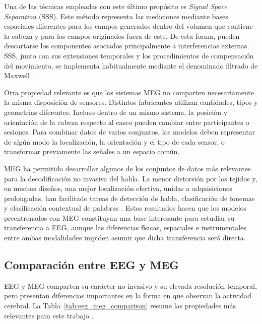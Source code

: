 

Una de las técnicas empleadas con este último propósito es \textit{Signal Space Separation} (SSS). Este método representa las mediciones mediante bases espaciales diferentes para los campos generados dentro del volumen que contiene la cabeza y para los campos originados fuera de este. De esta forma, pueden descartarse los componentes asociados principalmente a interferencias externas. SSS, junto con sus extensiones temporales y los procedimientos de compensación del movimiento, se implementa habitualmente mediante el denominado filtrado de Maxwell \cite{taulu2005sss}.

Otra propiedad relevante es que los sistemas MEG no comparten necesariamente la misma disposición de sensores. Distintos fabricantes utilizan cantidades, tipos y geometrías diferentes. Incluso dentro de un mismo sistema, la posición y orientación de la cabeza respecto al casco pueden cambiar entre participantes o sesiones. Para combinar datos de varios conjuntos, los modelos deben representar de algún modo la localización, la orientación y el tipo de cada sensor, o transformar previamente las señales a un espacio común.

MEG ha permitido desarrollar algunos de los conjuntos de datos más relevantes para la decodificación no invasiva del habla. La menor distorsión por los tejidos y, en muchos diseños, una mejor localización efectiva, unidas a adquisiciones prolongadas, han facilitado tareas de detección de habla, clasificación de fonemas y clasificación contextual de palabras \cite{hamalainen1993meg,gross2013meg}. Estos resultados hacen que los modelos preentrenados con MEG constituyan una base interesante para estudiar su transferencia a EEG, aunque las diferencias físicas, espaciales e instrumentales entre ambas modalidades impiden asumir que dicha transferencia será directa.


\subsection{Comparación entre EEG y MEG}

EEG y MEG comparten su carácter no invasivo y su elevada resolución temporal, pero presentan diferencias importantes en la forma en que observan la actividad cerebral. La Tabla~\ref{tab:eeg_meg_comparison} resume las propiedades más relevantes para este trabajo \cite{hamalainen1993meg,gross2013meg}.

